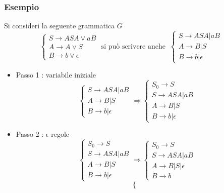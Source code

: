 \documentclass[10pt, letterpaper]{report}
\begin{document}
\subsubsection{Esempio}
Si consideri la seguente grammatica $G$ $$\begin{cases}
    S\longrightarrow ASA\lor aB \\ 
    A \longrightarrow A\lor S  \\ 
    B \longrightarrow b\lor \epsilon
\end{cases} \text{ si può scrivere anche  } \ \begin{cases}
    S\longrightarrow ASA | aB \\ 
    A \longrightarrow B| S  \\ 
    B \longrightarrow b| \epsilon
\end{cases} $$\begin{itemize}
    \item Passo 1 : variabile iniziale
    $$ \begin{cases}
        S\longrightarrow ASA | aB \\ 
        A \longrightarrow B| S  \\ 
        B \longrightarrow b| \epsilon
    \end{cases} \Longrightarrow \begin{cases}
        S_0 \longrightarrow S\\
        S\longrightarrow ASA | aB \\ 
        A \longrightarrow B| S  \\ 
        B \longrightarrow b| \epsilon
    \end{cases} $$
    \item Passo 2 : $\epsilon$-regole $$ 
    \begin{cases}
        S_0 \longrightarrow S\\
        S\longrightarrow ASA | aB \\ 
        A \longrightarrow B| S  \\ 
        B \longrightarrow b| \epsilon
    \end{cases}\Longrightarrow
    \begin{cases}
        S_0 \longrightarrow S\\
        S\longrightarrow ASA |  aB  \\ 
        A \longrightarrow B| S  | \epsilon \\ 
        B \longrightarrow b
    \end{cases}
    $$
    $$\begin{cases}

\end{cases}$$
\end{itemize}
\end{document}
